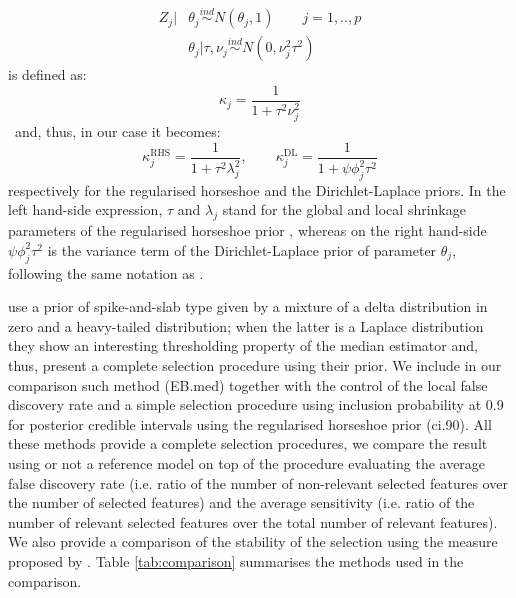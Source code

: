 \documentclass[american,]{article}
\theoremstyle{definition}
\begin{document}
\begin{align}
Z_{j}|&\theta_{j}\overset{ind}{\sim}N(\theta_{j},1) \qquad j=1,..,p \\
&\theta_{j}|\tau,\nu_{j}\overset{ind}{\sim}N(0,\nu_{j}^{2}\tau^{2})
\end{align}
is defined as:
\begin{equation}
\kappa_{j}=\frac{1}{1+\tau^{2}\nu_{j}^{2}}
\end{equation}
\
and, thus, in our case it becomes:
\begin{equation}
\kappa_{j}^{\text{RHS}}=\frac{1}{1+\tau^{2}\lambda_{j}^{2}}, \qquad \kappa_{j}^{\text{DL}}=\frac{1}{1+\psi\phi_{j}^{2}\tau^{2}}
\end{equation}
respectively for the regularised horseshoe and the Dirichlet-Laplace priors. In the left hand-side expression, $\tau$ and $\lambda_{j}$ stand for the global and local shrinkage parameters of the regularised horseshoe prior \cite[notation and further details in][]{paper:rhs}, whereas on the right hand-side $\psi\phi_{j}^{2}\tau^{2}$ is the variance term of the Dirichlet-Laplace prior of parameter $\theta_{j}$, following the same notation as \cite{paper:dirichlet_laplace}.


\cite{johnstone2004needles} use a prior of spike-and-slab type \citep{paper:spike_slab_mitchell} given by a mixture of a delta distribution in zero and a heavy-tailed distribution; when the latter is a Laplace distribution they show an interesting thresholding property of the median estimator and, thus, present a complete selection procedure using their prior. We include in our comparison such method (EB.med) together with the control of the local false discovery rate \cite[loc.fdr; see][]{efron2012large, paper:efron} and a simple selection procedure using inclusion probability at 0.9 for posterior credible intervals using the regularised horseshoe prior (ci.90). All these methods provide a complete selection procedures, we compare the result using or not a reference model on top of the procedure evaluating the average false discovery rate (i.e. ratio of the number of non-relevant selected features over the number of selected features) and the average sensitivity (i.e. ratio of the number of relevant selected features over the total number of relevant features). We also provide a comparison of the stability of the selection using the measure proposed by \cite{paper:stability}. Table \ref{tab:comparison} summarises the methods used in the comparison.
\end{document}
